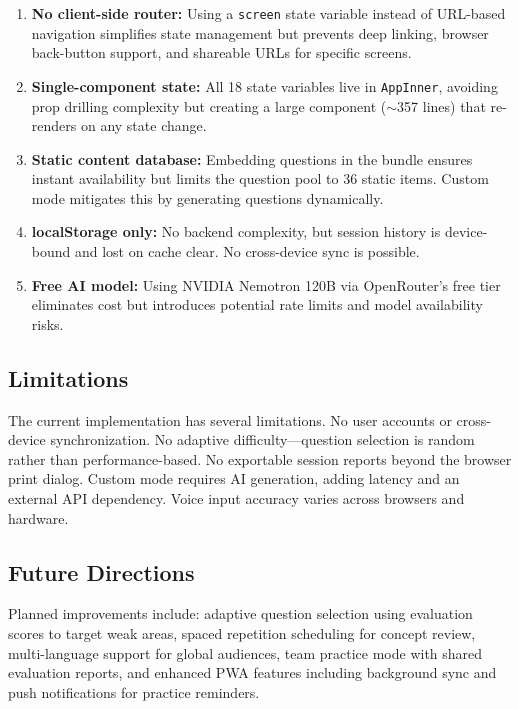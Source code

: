 \documentclass[11pt]{article}
\begin{document}
\begin{enumerate}[leftmargin=*, label=(\Roman*)]
  \item \textbf{No client-side router:} Using a \texttt{screen} state variable instead of URL-based navigation simplifies state management but prevents deep linking, browser back-button support, and shareable URLs for specific screens.
  \item \textbf{Single-component state:} All 18 state variables live in \texttt{AppInner}, avoiding prop drilling complexity but creating a large component ($\sim$357 lines) that re-renders on any state change.
  \item \textbf{Static content database:} Embedding questions in the bundle ensures instant availability but limits the question pool to 36 static items. Custom mode mitigates this by generating questions dynamically.
  \item \textbf{localStorage only:} No backend complexity, but session history is device-bound and lost on cache clear. No cross-device sync is possible.
  \item \textbf{Free AI model:} Using NVIDIA Nemotron 120B via OpenRouter's free tier eliminates cost but introduces potential rate limits and model availability risks.
\end{enumerate}

\subsection{Limitations}

The current implementation has several limitations. No user accounts or cross-device synchronization. No adaptive difficulty---question selection is random rather than performance-based. No exportable session reports beyond the browser print dialog. Custom mode requires AI generation, adding latency and an external API dependency. Voice input accuracy varies across browsers and hardware.

\subsection{Future Directions}

Planned improvements include: adaptive question selection using evaluation scores to target weak areas, spaced repetition scheduling for concept review, multi-language support for global audiences, team practice mode with shared evaluation reports, and enhanced PWA features including background sync and push notifications for practice reminders.
\end{document}
